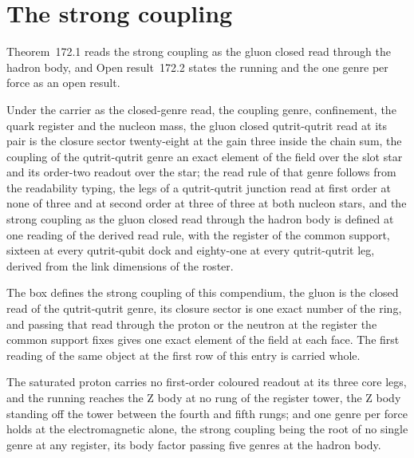\label{chend:VII-1-confinement-as-the-dark-genre-readability}
\par\medskip{}\label{narr:close:7-1}\par
\section{The strong coupling}\label{mod:VII-2-strong-coupling}
\label{narr:open:7-2}Theorem~172.1 reads the strong coupling as the gluon closed read through the hadron body, and Open result~172.2 states the running and the one genre per force as an open result.
\begin{chconditional}\label{box:VII-2-strong-coupling:1}
Under the carrier as the closed-genre read, the coupling genre, confinement, the quark register and the nucleon mass, the gluon closed qutrit-qutrit read at its pair is the closure sector twenty-eight at the gain three inside the chain sum, the coupling of the qutrit-qutrit genre an exact element of the field over the slot star and its order-two readout over the star; the read rule of that genre follows from the readability typing, the legs of a qutrit-qutrit junction read at first order at none of three and at second order at three of three at both nucleon stars, and the strong coupling as the gluon closed read through the hadron body is defined at one reading of the derived read rule, with the register of the common support, sixteen at every qutrit-qubit dock and eighty-one at every qutrit-qutrit leg, derived from the link dimensions of the roster.
\end{chconditional}
The box defines the strong coupling of this compendium, the gluon is the closed read of the qutrit-qutrit genre, its closure sector is one exact number of the ring, and passing that read through the proton or the neutron at the register the common support fixes gives one exact element of the field at each face. The first reading of the same object at the first row of this entry is carried whole.
\begin{chwall}\label{box:VII-2-strong-coupling:2}
The saturated proton carries no first-order coloured readout at its three core legs, and the running reaches the Z body at no rung of the register tower, the Z body standing off the tower between the fourth and fifth rungs; and one genre per force holds at the electromagnetic alone, the strong coupling being the root of no single genre at any register, its body factor passing five genres at the hadron body.
\end{chwall}
